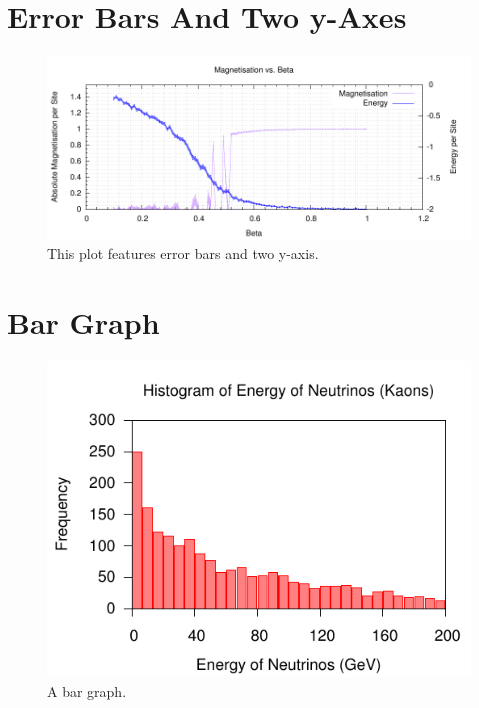 \documentclass[10pt,a4paper,final]{report}
\begin{document}
\section{Error Bars And Two y-Axes}
\begin{figure}[!hbtp]
\centering
\includegraphics[width=\textwidth]{../CodeLisa/BETAM/BETA2.pdf}
\caption{This plot features error bars and two y-axis.}
\end{figure}


\section{Bar Graph}
\begin{figure}[!hbtp]
\centering
\includegraphics[width=\textwidth]{../CodeLisa/HIST/NEUTMOMK.pdf}
\caption{A bar graph.}
\end{figure}

\end{document}
